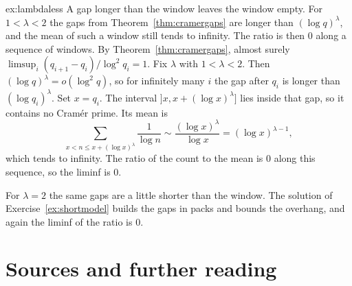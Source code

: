 \begin{solution}{ex:lambdaless}
\idea A gap longer than the window leaves the window empty. For $1<\lambda<2$ the gaps from Theorem~\ref{thm:cramergaps} are longer than $(\log q)^\lambda$, and the mean of such a window still tends to infinity. The ratio is then $0$ along a sequence of windows.
\writeup By Theorem~\ref{thm:cramergaps}, almost surely $\limsup_i(q_{i+1}-q_i)/\log^2 q_i=1$. Fix $\lambda$ with $1<\lambda<2$. Then $(\log q)^\lambda=o(\log^2 q)$, so for infinitely many $i$ the gap after $q_i$ is longer than $(\log q_i)^\lambda$. Set $x=q_i$. The interval $]x,x+(\log x)^\lambda]$ lies inside that gap, so it contains no Cramér prime. Its mean is
\[
\sum_{x<n\le x+(\log x)^\lambda}\frac1{\log n}\sim\frac{(\log x)^\lambda}{\log x}=(\log x)^{\lambda-1},
\]
which tends to infinity. The ratio of the count to the mean is $0$ along this sequence, so the liminf is $0$.

For $\lambda=2$ the same gaps are a little shorter than the window. The solution of Exercise~\ref{ex:shortmodel} builds the gaps in packs and bounds the overhang, and again the liminf of the ratio is $0$.
\end{solution}

\section*{Sources and further reading}

